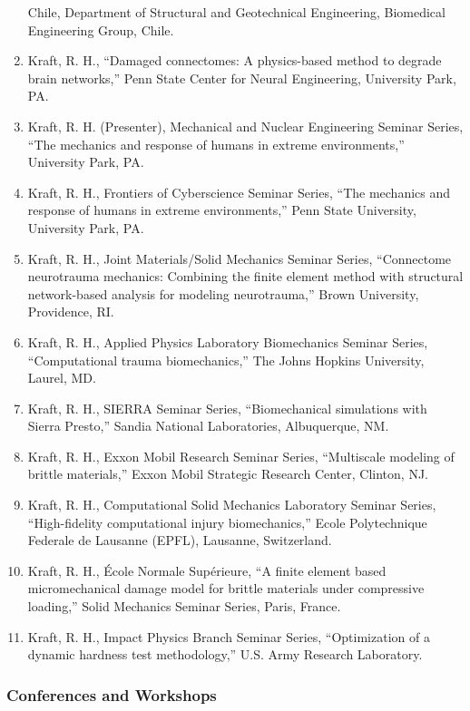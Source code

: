 \documentclass[11pt]{article}
\begin{document}
\begin{enumerate}
  Chile, Department of Structural and Geotechnical Engineering,
  Biomedical Engineering Group, Chile.
\item
  Kraft, R. 
H., ``Damaged connectomes: A physics-based method to degrade
  brain networks,'' Penn State Center for Neural Engineering, University
  Park, PA.
\item
  Kraft, R. 
H. 
(Presenter), Mechanical and Nuclear Engineering Seminar
  Series, ``The mechanics and response of humans in extreme
  environments,'' University Park, PA.
\item
  Kraft, R. 
H., Frontiers of Cyberscience Seminar Series, ``The mechanics
  and response of humans in extreme environments,'' Penn State
  University, University Park, PA.
\item
  Kraft, R. 
H., Joint Materials/Solid Mechanics Seminar Series,
  ``Connectome neurotrauma mechanics: Combining the finite element method
  with structural network-based analysis for modeling neurotrauma,''
  Brown University, Providence, RI.
\item
  Kraft, R. 
H., Applied Physics Laboratory Biomechanics Seminar Series,
  ``Computational trauma biomechanics,'' The Johns Hopkins University,
  Laurel, MD.
\item
  Kraft, R. 
H., SIERRA Seminar Series, ``Biomechanical simulations with
  Sierra Presto,'' Sandia National Laboratories, Albuquerque, NM.
\item
  Kraft, R. 
H., Exxon Mobil Research Seminar Series, ``Multiscale
  modeling of brittle materials,'' Exxon Mobil Strategic Research Center,
  Clinton, NJ.
\item
  Kraft, R. 
H., Computational Solid Mechanics Laboratory Seminar Series,
  ``High-fidelity computational injury biomechanics,'' Ecole Polytechnique
  Federale de Lausanne (EPFL), Lausanne, Switzerland.
\item
  Kraft, R. 
H., École Normale Supérieure, ``A finite element based
  micromechanical damage model for brittle materials under compressive
  loading,'' Solid Mechanics Seminar Series, Paris, France.
\item
  Kraft, R. 
H., Impact Physics Branch Seminar Series, ``Optimization of a
  dynamic hardness test methodology,'' U.S. 
Army Research Laboratory.
\end{enumerate}

\subsubsection{Conferences and Workshops}\label{uncategorized-presentations}
\end{document}
